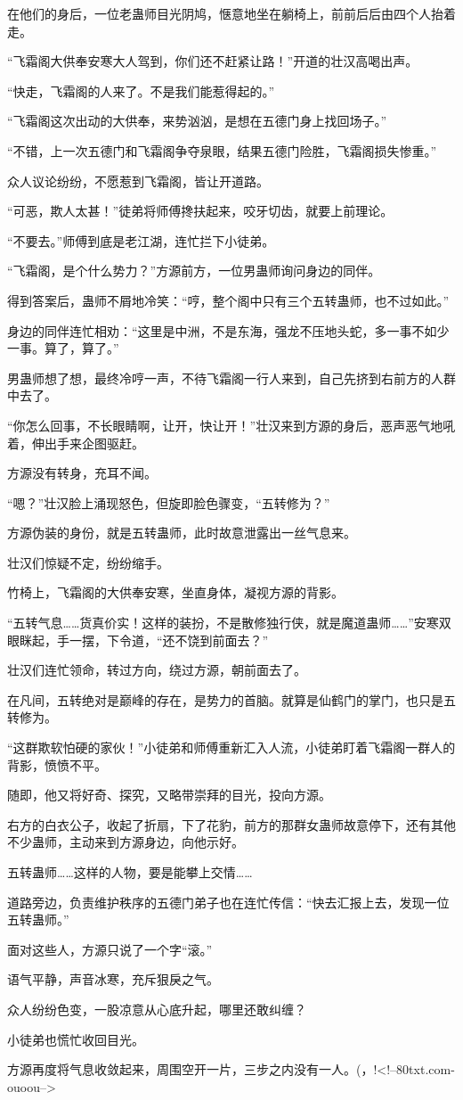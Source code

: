 \begin{this_body}
在他们的身后，一位老蛊师目光阴鸠，惬意地坐在躺椅上，前前后后由四个人抬着走。

“飞霜阁大供奉安寒大人驾到，你们还不赶紧让路！”开道的壮汉高喝出声。

“快走，飞霜阁的人来了。不是我们能惹得起的。”

“飞霜阁这次出动的大供奉，来势汹汹，是想在五德门身上找回场子。”

“不错，上一次五德门和飞霜阁争夺泉眼，结果五德门险胜，飞霜阁损失惨重。”

众人议论纷纷，不愿惹到飞霜阁，皆让开道路。

“可恶，欺人太甚！”徒弟将师傅搀扶起来，咬牙切齿，就要上前理论。

“不要去。”师傅到底是老江湖，连忙拦下小徒弟。

“飞霜阁，是个什么势力？”方源前方，一位男蛊师询问身边的同伴。

得到答案后，蛊师不屑地冷笑：“哼，整个阁中只有三个五转蛊师，也不过如此。”

身边的同伴连忙相劝：“这里是中洲，不是东海，强龙不压地头蛇，多一事不如少一事。算了，算了。”

男蛊师想了想，最终冷哼一声，不待飞霜阁一行人来到，自己先挤到右前方的人群中去了。

“你怎么回事，不长眼睛啊，让开，快让开！”壮汉来到方源的身后，恶声恶气地吼着，伸出手来企图驱赶。

方源没有转身，充耳不闻。

“嗯？”壮汉脸上涌现怒色，但旋即脸色骤变，“五转修为？”

方源伪装的身份，就是五转蛊师，此时故意泄露出一丝气息来。

壮汉们惊疑不定，纷纷缩手。

竹椅上，飞霜阁的大供奉安寒，坐直身体，凝视方源的背影。

“五转气息……货真价实！这样的装扮，不是散修独行侠，就是魔道蛊师……”安寒双眼眯起，手一摆，下令道，“还不饶到前面去？”

壮汉们连忙领命，转过方向，绕过方源，朝前面去了。

在凡间，五转绝对是巅峰的存在，是势力的首脑。就算是仙鹤门的掌门，也只是五转修为。

“这群欺软怕硬的家伙！”小徒弟和师傅重新汇入人流，小徒弟盯着飞霜阁一群人的背影，愤愤不平。

随即，他又将好奇、探究，又略带崇拜的目光，投向方源。

右方的白衣公子，收起了折扇，下了花豹，前方的那群女蛊师故意停下，还有其他不少蛊师，主动来到方源身边，向他示好。

五转蛊师……这样的人物，要是能攀上交情……

道路旁边，负责维护秩序的五德门弟子也在连忙传信：“快去汇报上去，发现一位五转蛊师。”

面对这些人，方源只说了一个字“滚。”

语气平静，声音冰寒，充斥狠戾之气。

众人纷纷色变，一股凉意从心底升起，哪里还敢纠缠？

小徒弟也慌忙收回目光。

方源再度将气息收敛起来，周围空开一片，三步之内没有一人。(，!<!--80txt.com-ouoou-->

\end{this_body}

